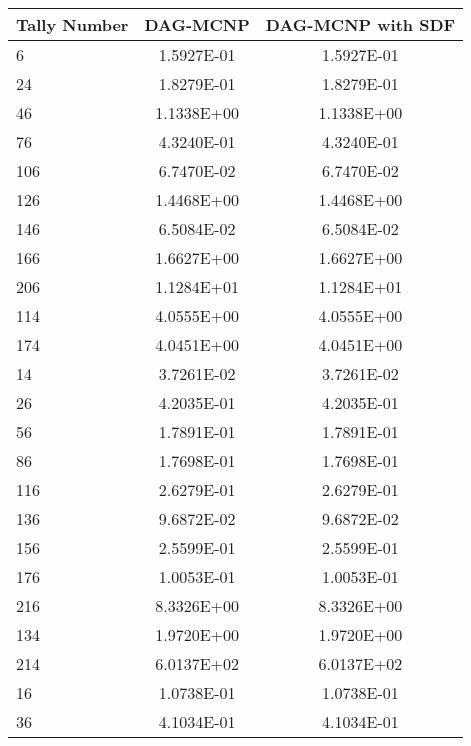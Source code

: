   \begin{table}[H]
    \small
    \begin{center}
      \begin{tabular}{lcc}
        \toprule
        Tally Number & DAG-MCNP   & DAG-MCNP with SDF \\
        \toprule
        6            & 1.5927E-01 & 1.5927E-01        \\
        24           & 1.8279E-01 & 1.8279E-01        \\
        46           & 1.1338E+00 & 1.1338E+00        \\
        76           & 4.3240E-01 & 4.3240E-01        \\
        106          & 6.7470E-02 & 6.7470E-02        \\
        126          & 1.4468E+00 & 1.4468E+00        \\
        146          & 6.5084E-02 & 6.5084E-02        \\
        166          & 1.6627E+00 & 1.6627E+00        \\
        206          & 1.1284E+01 & 1.1284E+01        \\
        114          & 4.0555E+00 & 4.0555E+00        \\
        174          & 4.0451E+00 & 4.0451E+00        \\
        14           & 3.7261E-02 & 3.7261E-02        \\
        26           & 4.2035E-01 & 4.2035E-01        \\
        56           & 1.7891E-01 & 1.7891E-01        \\
        86           & 1.7698E-01 & 1.7698E-01        \\
        116          & 2.6279E-01 & 2.6279E-01        \\
        136          & 9.6872E-02 & 9.6872E-02        \\
        156          & 2.5599E-01 & 2.5599E-01        \\
        176          & 1.0053E-01 & 1.0053E-01        \\
        216          & 8.3326E+00 & 8.3326E+00        \\
        134          & 1.9720E+00 & 1.9720E+00        \\
        214          & 6.0137E+02 & 6.0137E+02        \\
        16           & 1.0738E-01 & 1.0738E-01        \\
        36           & 4.1034E-01 & 4.1034E-01        \\

\end{tabular}
\end{center}
\end{table}
